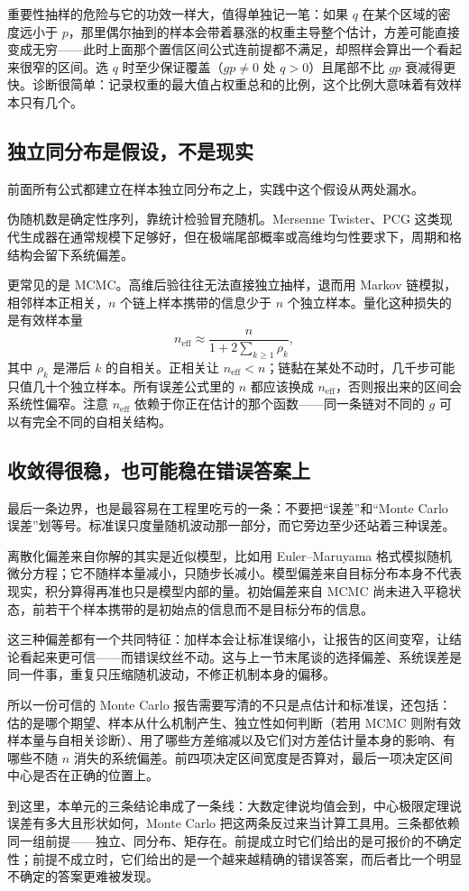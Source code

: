 重要性抽样的危险与它的功效一样大，值得单独记一笔：如果 \(q\) 在某个区域的密度远小于 \(p\)，那里偶尔抽到的样本会带着暴涨的权重主导整个估计，方差可能直接变成无穷——此时上面那个置信区间公式连前提都不满足，却照样会算出一个看起来很窄的区间。选 \(q\) 时至少保证覆盖（\(g p\neq0\) 处 \(q>0\)）且尾部不比 \(gp\) 衰减得更快。诊断很简单：记录权重的最大值占权重总和的比例，这个比例大意味着有效样本只有几个。

\subsection{独立同分布是假设，不是现实}

前面所有公式都建立在样本独立同分布之上，实践中这个假设从两处漏水。

伪随机数是确定性序列，靠统计检验冒充随机。Mersenne Twister、PCG 这类现代生成器在通常规模下足够好，但在极端尾部概率或高维均匀性要求下，周期和格结构会留下系统偏差。

更常见的是 MCMC。高维后验往往无法直接独立抽样，退而用 Markov 链模拟，相邻样本正相关，\(n\) 个链上样本携带的信息少于 \(n\) 个独立样本。量化这种损失的是有效样本量
\[
n_{\mathrm{eff}}\approx\frac{n}{1+2\sum_{k\ge1}\rho_k},
\]
其中 \(\rho_k\) 是滞后 \(k\) 的自相关。正相关让 \(n_{\mathrm{eff}}<n\)；链黏在某处不动时，几千步可能只值几十个独立样本。所有误差公式里的 \(n\) 都应该换成 \(n_{\mathrm{eff}}\)，否则报出来的区间会系统性偏窄。注意 \(n_{\mathrm{eff}}\) 依赖于你正在估计的那个函数——同一条链对不同的 \(g\) 可以有完全不同的自相关结构。

\subsection{收敛得很稳，也可能稳在错误答案上}

最后一条边界，也是最容易在工程里吃亏的一条：不要把``误差''和``Monte Carlo 误差''划等号。标准误只度量随机波动那一部分，而它旁边至少还站着三种误差。

离散化偏差来自你解的其实是近似模型，比如用 Euler--Maruyama 格式模拟随机微分方程；它不随样本量减小，只随步长减小。模型偏差来自目标分布本身不代表现实，积分算得再准也只是模型内部的量。初始偏差来自 MCMC 尚未进入平稳状态，前若干个样本携带的是初始点的信息而不是目标分布的信息。

这三种偏差都有一个共同特征：加样本会让标准误缩小，让报告的区间变窄，让结论看起来更可信——而错误纹丝不动。这与上一节末尾谈的选择偏差、系统误差是同一件事，重复只压缩随机波动，不修正机制本身的偏移。

所以一份可信的 Monte Carlo 报告需要写清的不只是点估计和标准误，还包括：估的是哪个期望、样本从什么机制产生、独立性如何判断（若用 MCMC 则附有效样本量与自相关诊断）、用了哪些方差缩减以及它们对方差估计量本身的影响、有哪些不随 \(n\) 消失的系统偏差。前四项决定区间宽度是否算对，最后一项决定区间中心是否在正确的位置上。

到这里，本单元的三条结论串成了一条线：大数定律说均值会到，中心极限定理说误差有多大且形状如何，Monte Carlo 把这两条反过来当计算工具用。三条都依赖同一组前提——独立、同分布、矩存在。前提成立时它们给出的是可报价的不确定性；前提不成立时，它们给出的是一个越来越精确的错误答案，而后者比一个明显不确定的答案更难被发现。
